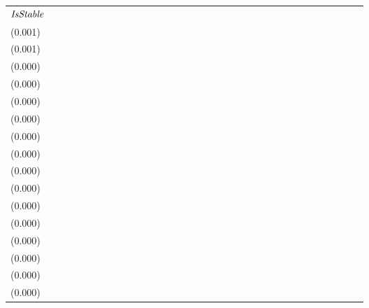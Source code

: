 \begin{tabular}{lllllllllllllllllllllllllllllllll}
${\it IsStable}$             &   \makecell{$0.032^{**}$ \\(0.001)} &   \makecell{$0.031^{**}$ \\(0.001)} &                                     &                                     &  \makecell{$0.001^{**}$ \\(0.000)} &  \makecell{$0.001^{**}$ \\(0.000)} &                                     &                                     &  \makecell{$-0.005^{**}$ \\(0.000)} &  \makecell{$-0.005^{**}$ \\(0.000)} &                                     &                                     &  \makecell{$-0.000^{**}$ \\(0.000)} &  \makecell{$-0.001^{**}$ \\(0.000)} &                                     &                                     &  \makecell{$-0.021^{**}$ \\(0.000)} &  \makecell{$-0.021^{**}$ \\(0.000)} &                                     &                                     &  \makecell{$-0.001^{**}$ \\(0.000)} &  \makecell{$-0.001^{**}$ \\(0.000)} &                                    &                                    &   \makecell{$0.009^{**}$ \\(0.000)} &   \makecell{$0.008^{**}$ \\(0.000)} &                                     &                                    &    \makecell{$0.000^{}$ \\(0.000)} &    \makecell{$0.000^{}$ \\(0.000)} &                                    &                                    \\

\end{tabular}
